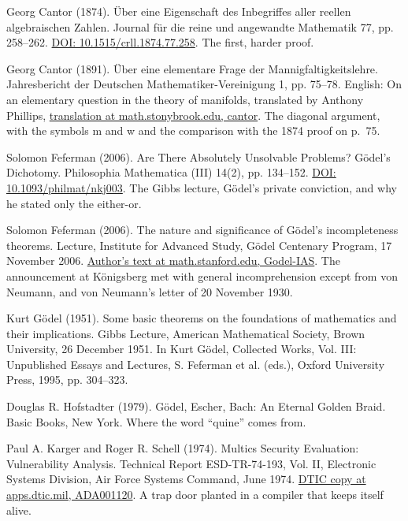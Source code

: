 \documentclass[11pt,twoside]{article}
\theoremstyle{thielethm}
\theoremstyle{thieledef}
\theoremstyle{thieledef}
\theoremstyle{thieledef}
\theoremstyle{thielethm}
\theoremstyle{thieleobs}
\theoremstyle{thielethm}
\begin{document}
\noindent Georg Cantor (1874). \"Uber eine Eigenschaft des Inbegriffes aller reellen algebraischen Zahlen. Journal f\"ur die reine und angewandte Mathematik 77, pp. 258--262. \href{https://doi.org/10.1515/crll.1874.77.258}{DOI: 10.1515/crll.1874.77.258}. The first, harder proof.
\par\medskip

\noindent Georg Cantor (1891). \"Uber eine elementare Frage der Mannigfaltigkeitslehre. Jahresbericht der Deutschen Mathematiker-Vereinigung 1, pp. 75--78. English: On an elementary question in the theory of manifolds, translated by Anthony Phillips, \href{https://math.stonybrook.edu/~tony/archive/336f06/cantor/cantor.html}{translation at math.stonybrook.edu, cantor}. The diagonal argument, with the symbols m and w and the comparison with the 1874 proof on p.~75.
\par\medskip

\noindent Solomon Feferman (2006). Are There Absolutely Unsolvable Problems? G\"odel's Dichotomy. Philosophia Mathematica (III) 14(2), pp. 134--152. \href{https://doi.org/10.1093/philmat/nkj003}{DOI: 10.1093/philmat/nkj003}. The Gibbs lecture, G\"odel's private conviction, and why he stated only the either-or.
\par\medskip

\noindent Solomon Feferman (2006). The nature and significance of G\"odel's incompleteness theorems. Lecture, Institute for Advanced Study, G\"odel Centenary Program, 17 November 2006. \href{https://math.stanford.edu/~feferman/papers/Godel-IAS.pdf}{Author's text at math.stanford.edu, Godel-IAS}. The announcement at K\"onigsberg met with general incomprehension except from von Neumann, and von Neumann's letter of 20 November 1930.
\par\medskip

\noindent Kurt G\"odel (1951). Some basic theorems on the foundations of mathematics and their implications. Gibbs Lecture, American Mathematical Society, Brown University, 26 December 1951. In Kurt G\"odel, Collected Works, Vol. III: Unpublished Essays and Lectures, S. Feferman et al. (eds.), Oxford University Press, 1995, pp. 304--323.
\par\medskip

\noindent Douglas R. Hofstadter (1979). G\"odel, Escher, Bach: An Eternal Golden Braid. Basic Books, New York. Where the word ``quine'' comes from.
\par\medskip

\noindent Paul A. Karger and Roger R. Schell (1974). Multics Security Evaluation: Vulnerability Analysis. Technical Report ESD-TR-74-193, Vol. II, Electronic Systems Division, Air Force Systems Command, June 1974. \href{https://apps.dtic.mil/sti/pdfs/ADA001120.pdf}{DTIC copy at apps.dtic.mil, ADA001120}. A trap door planted in a compiler that keeps itself alive.
\par\medskip
\end{document}
